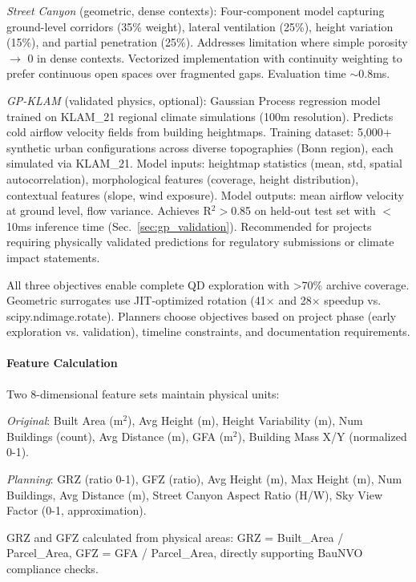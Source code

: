 \documentclass[times,final]{elsarticle}
\begin{document}
\textit{Street Canyon} (geometric, dense contexts): Four-component model capturing ground-level corridors (35\% weight), lateral ventilation (25\%), height variation (15\%), and partial penetration (25\%). Addresses limitation where simple porosity $\rightarrow$ 0 in dense contexts. Vectorized implementation with continuity weighting to prefer continuous open spaces over fragmented gaps. Evaluation time $\sim$0.8ms.

\textit{GP-KLAM} (validated physics, optional): Gaussian Process regression model trained on KLAM\_21 regional climate simulations (100m resolution). Predicts cold airflow velocity fields from building heightmaps. Training dataset: 5,000+ synthetic urban configurations across diverse topographies (Bonn region), each simulated via KLAM\_21. Model inputs: heightmap statistics (mean, std, spatial autocorrelation), morphological features (coverage, height distribution), contextual features (slope, wind exposure). Model outputs: mean airflow velocity at ground level, flow variance. Achieves R$^2>$0.85 on held-out test set with $<$10ms inference time (Sec.~\ref{sec:gp_validation}). Recommended for projects requiring physically validated predictions for regulatory submissions or climate impact statements.

All three objectives enable complete QD exploration with >70\% archive coverage. Geometric surrogates use JIT-optimized rotation (41$\times$ and 28$\times$ speedup vs. scipy.ndimage.rotate). Planners choose objectives based on project phase (early exploration vs. validation), timeline constraints, and documentation requirements.

\paragraph{Feature Calculation}
Two 8-dimensional feature sets maintain physical units:

\textit{Original}: Built Area (m$^2$), Avg Height (m), Height Variability (m), Num Buildings (count), Avg Distance (m), GFA (m$^2$), Building Mass X/Y (normalized 0-1).

\textit{Planning}: GRZ (ratio 0-1), GFZ (ratio), Avg Height (m), Max Height (m), Num Buildings, Avg Distance (m), Street Canyon Aspect Ratio (H/W), Sky View Factor (0-1, approximation).

GRZ and GFZ calculated from physical areas: GRZ = Built\_Area / Parcel\_Area, GFZ = GFA / Parcel\_Area, directly supporting BauNVO compliance checks.
\end{document}
